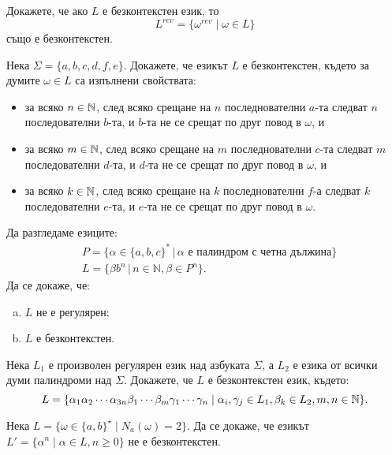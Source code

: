 \begin{problem}
  Докажете, че ако $L$ е безконтекстен език, то 
  \[L^{rev} = \{\omega^{rev} \mid \omega \in L\}\]
  също е безконтекстен.
\end{problem}


\begin{problem}
  Нека $\Sigma = \{a,b,c,d,f,e\}$.
  Докажете, че езикът $L$ е безконтекстен, където за думите $\omega \in L$ са изпълнени свойствата:
  \begin{itemize}[-]
  \item 
    за всяко $n\in\mathbb{N}$, след всяко срещане на $n$ последнователни $a$-та
    следват $n$ последователни $b$-та, и $b$-та не се срещат по друг повод в $\omega$, и
  \item
    за всяко $m\in\mathbb{N}$, след всяко срещане на $m$ последнователни $c$-та
    следват $m$ последователни $d$-та, и $d$-та не се срещат по друг повод в $\omega$, и
  \item
    за всяко $k\in\mathbb{N}$, след всяко срещане на $k$ последнователни $f$-а
    следват $k$ последователни $e$-та, и $e$-та не се срещат по друг повод в $\omega$.
  \end{itemize}
\end{problem}

\begin{problem}
  Да разгледаме езиците:
  \begin{align*}
    & P = \{\alpha\in\{a,b,c\}^*\,|\, \alpha \text{ е палиндром с четна дължина}\} \\
    & L =  \{\beta b^n\,|\, n\in\mathbb{N}, \beta\in P^n\}.
  \end{align*}
  Да се докаже, че:
  \begin{enumerate}[a)]
  \item 
    $L$ не е регулярен;
  \item 
    $L$ е безконтекстен.
  \end{enumerate}
\end{problem}

\begin{problem}
  Нека $L_1$ е произволен регулярен език над азбуката $\Sigma$, 
  а $L_2$ е езика от всички думи палиндроми над $\Sigma$.
  Докажете, че $L$ е безконтекстен език, където:
  \[L = \{\alpha_1\alpha_2\cdots\alpha_{3n}\beta_1\cdots\beta_m\gamma_1\cdots\gamma_n \mid \alpha_i,\gamma_j \in L_1, \beta_k\in L_2, m,n \in \mathbb{N}\}.\]
\end{problem}

\begin{problem}
  Нека $L = \{\omega\in\{a,b\}^\star \mid N_a(\omega) = 2\}$.
  Да се докаже, че езикът $L' = \{\alpha^n \mid \alpha\in L, n \geq 0\}$ не е безконтекстен.
\end{problem}


